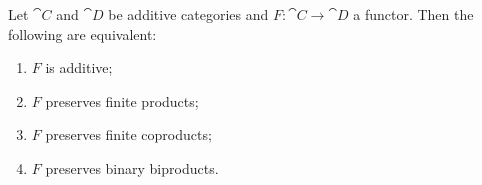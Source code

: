 \begin{lem}\label{lem:characterisation-additive-functor}
Let \(\cat C\) and \(\cat D\) be additive categories and \(F\colon\cat C\to\cat D\) a functor.
Then the following are equivalent:
\begin{enumerate}
\item\label{lem:characterisation-additive-functor:additive} \(F\) is additive;
\item\label{lem:characterisation-additive-functor:products} \(F\) preserves finite products;
\item\label{lem:characterisation-additive-functor:coproducts} \(F\) preserves finite coproducts;
\item\label{lem:characterisation-additive-functor:biproducts} \(F\) preserves binary biproducts.
\end{enumerate}
\end{lem}
